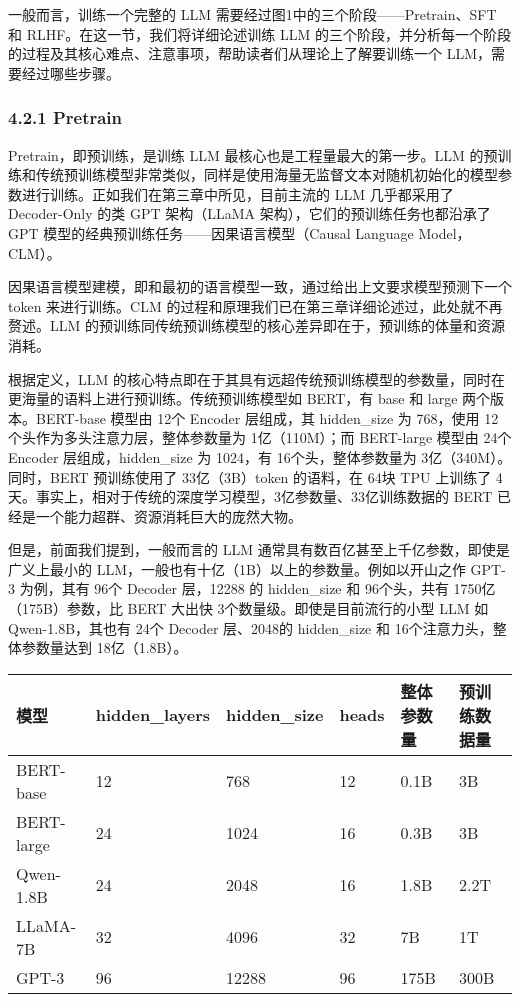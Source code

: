 \documentclass[
]{article}
\begin{document}
一般而言，训练一个完整的 LLM 需要经过图1中的三个阶段------Pretrain、SFT
和 RLHF。在这一节，我们将详细论述训练 LLM
的三个阶段，并分析每一个阶段的过程及其核心难点、注意事项，帮助读者们从理论上了解要训练一个
LLM，需要经过哪些步骤。

\subsubsection{4.2.1 Pretrain}\label{pretrain}

Pretrain，即预训练，是训练 LLM 最核心也是工程量最大的第一步。LLM
的预训练和传统预训练模型非常类似，同样是使用海量无监督文本对随机初始化的模型参数进行训练。正如我们在第三章中所见，目前主流的
LLM 几乎都采用了 Decoder-Only 的类 GPT 架构（LLaMA
架构），它们的预训练任务也都沿承了 GPT
模型的经典预训练任务------因果语言模型（Causal Language Model，CLM）。

因果语言模型建模，即和最初的语言模型一致，通过给出上文要求模型预测下一个
token 来进行训练。CLM
的过程和原理我们已在第三章详细论述过，此处就不再赘述。LLM
的预训练同传统预训练模型的核心差异即在于，预训练的体量和资源消耗。

根据定义，LLM
的核心特点即在于其具有远超传统预训练模型的参数量，同时在更海量的语料上进行预训练。传统预训练模型如
BERT，有 base 和 large 两个版本。BERT-base 模型由 12个 Encoder
层组成，其 hidden\_size 为 768，使用
12个头作为多头注意力层，整体参数量为 1亿（110M）；而 BERT-large 模型由
24个 Encoder 层组成，hidden\_size 为 1024，有 16个头，整体参数量为
3亿（340M）。同时，BERT 预训练使用了 33亿（3B）token 的语料，在 64块 TPU
上训练了
4天。事实上，相对于传统的深度学习模型，3亿参数量、33亿训练数据的 BERT
已经是一个能力超群、资源消耗巨大的庞然大物。

但是，前面我们提到，一般而言的 LLM
通常具有数百亿甚至上千亿参数，即使是广义上最小的
LLM，一般也有十亿（1B）以上的参数量。例如以开山之作 GPT-3 为例，其有
96个 Decoder 层，12288 的 hidden\_size 和 96个头，共有
1750亿（175B）参数，比 BERT 大出快 3个数量级。即使是目前流行的小型 LLM
如 Qwen-1.8B，其也有 24个 Decoder 层、2048的 hidden\_size 和
16个注意力头，整体参数量达到 18亿（1.8B）。

\begin{longtable}[]{@{}llllll@{}}
\toprule\noalign{}
模型 & hidden\_layers & hidden\_size & heads & 整体参数量 &
预训练数据量 \\
\midrule\noalign{}
\endhead
\bottomrule\noalign{}
\endlastfoot
BERT-base & 12 & 768 & 12 & 0.1B & 3B \\
BERT-large & 24 & 1024 & 16 & 0.3B & 3B \\
Qwen-1.8B & 24 & 2048 & 16 & 1.8B & 2.2T \\
LLaMA-7B & 32 & 4096 & 32 & 7B & 1T \\
GPT-3 & 96 & 12288 & 96 & 175B & 300B \\
\end{longtable}
\end{document}
